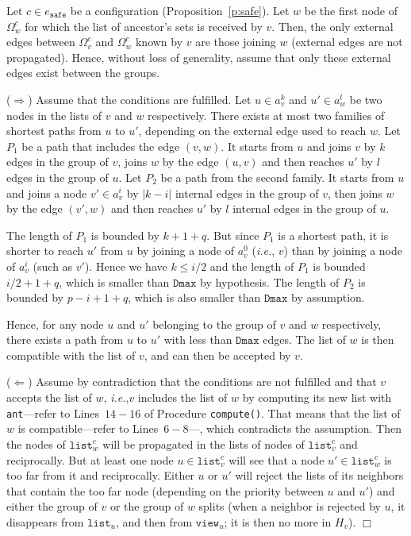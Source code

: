 \documentclass[11pt,english]{article}
\newcommand{\Latin}[1]{\textit{#1}}
\newcommand{\ie}{\Latin{i.e.},\xspace}
\newenvironment{proof}[1][0cm]{
  \begin{list}{\bf Proof.~}{
      \setlength{\itemindent}{0cm}
      \setlength{\labelsep}{0cm}
      \setlength{\labelwidth}{#1}
      \setlength{\leftmargin}{#1}
    \item
    }
}{\hfill$\Box$
  \end{list}
}
\begin{document}
\begin{proof}
  Let $c \in e_\texttt{safe}$ be a configuration (Proposition~\ref{p:safe}).
  Let $w$ be the first node of $\Omega_w^c$ for which the list of ancestor's sets is
  received by $v$. Then, the only external edges between $\Omega_v^c$ and $\Omega_w^c$
  known by $v$ are those joining $w$ (external edges are not propagated). Hence,
  without loss of generality, assume that only these external edges exist
  between the groups.

  \noindent ($\Rightarrow$) Assume that the conditions are fulfilled.
Let $u \in a_v^k$ and $u' \in a_w^l$ be two nodes in the lists of $v$ and $w$
  respectively. There exists at most two families of shortest paths from $u$ to
  $u'$, depending on the external edge used to reach $w$.
Let $P_1$ be a path that includes the edge $(v,w)$. It starts from $u$ and
  joins $v$ by $k$ edges in the group of $v$, joins $w$ by the edge $(u,v)$ and
  then reaches $u'$ by $l$ edges in the group of $u$.
Let $P_2$ be a path from the second family. It starts from $u$ and joins a
  node $v' \in a_v^i$ by $|k-i|$ internal edges in the group of $v$, then joins
  $w$ by the edge $(v',w)$ and then reaches $u'$ by $l$ internal edges in the
  group of $u$.

  The length of $P_1$ is bounded by $k + 1 + q$.  But since $P_1$ is a shortest
  path, it is shorter to reach $u'$ from $u$ by joining a node of $a_v^0$ (\ie
  $v$) than by joining a node of $a_v^i$ (such as $v'$). Hence we have $k \leq
  i/2$ and the length of $P_1$ is bounded $i/2 + 1 + q$, which is smaller than
  $\texttt{Dmax}$ by hypothesis.
The length of $P_2$ is bounded by $p - i + 1 + q$, which is also smaller than
  $\texttt{Dmax}$ by assumption.

  Hence, for any node $u$ and $u'$ belonging to the group of $v$ and $w$
  respectively, there exists a path from $u$ to $u'$ with less than
  $\texttt{Dmax}$ edges. The list of $w$ is then compatible with the list of
  $v$, and can then be accepted by $v$.

  \noindent ($\Leftarrow$) Assume by contradiction that the conditions are not
  fulfilled and that $v$ accepts the list of $w$, \ie $v$ includes the list of
  $w$ by computing its new list with \texttt{ant}---refer to Lines~$14-16$ of
  Procedure \texttt{compute()}.  That means that the list of $w$ is
  compatible---refer to Lines~$6-8$---, which contradicts the assumption.  Then
  the nodes of $\texttt{list}_w^c$ will be propagated in the lists of nodes of
  $\texttt{list}_v^c$ and reciprocally. But at least one node $u \in
  \texttt{list}_v^c$ will see that a node $u' \in \texttt{list}_w^c$ is too
  far from it and reciprocally. Either $u$ or $u'$ will reject the lists of its
  neighbors that contain the too far node (depending on the priority between $u$
  and $u'$) and either the group of $v$ or the group of $w$ splits (when a
  neighbor is rejected by $u$, it disappears from $\texttt{list}_u$, and then
  from $\texttt{view}_u$; it is then no more in $H_v$).
\end{proof}
\end{document}
